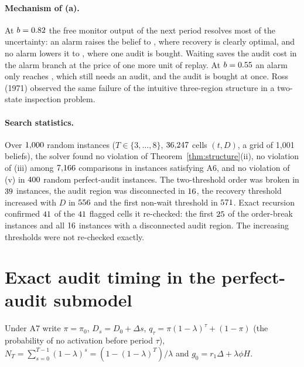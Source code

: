 \documentclass[11pt]{article}
\theoremstyle{definition}
\begin{document}
\paragraph{Mechanism of (a).} At $b=0.82$ the free monitor output of the next period resolves most of
the uncertainty: an alarm raises the belief to \PropPostHi, where recovery is clearly optimal, and no
alarm lowers it to \PropPostLo, where one audit is bought. Waiting saves the audit cost in the alarm branch
at the price of one more unit of replay. At $b=0.55$ an alarm only reaches \PropPostMid, which still
needs an audit, and the audit is bought at once. Ross (1971) observed the same failure of the intuitive
three-region structure in a two-state inspection problem.

\begin{table}[h]
\centering
\caption{Exhaustive enumeration for Proposition~\ref{prop:counter}: minimum expected cost over all
deterministic plans by first action.}\label{tab:prop2}

\end{table}

\paragraph{Search statistics.} Over $1{,}000$ random instances ($T\in\{3,\dots,8\}$, $36{,}247$
cells $(t,D)$, a grid of 1{,}001 beliefs), the solver found no violation of Theorem~\ref{thm:structure}(ii),
no violation of (iii) among $7{,}166$ comparisons in instances satisfying A6, and no violation of (v)
in $400$ random perfect-audit instances. The two-threshold order was broken in
$39$ instances, the audit region was disconnected in $16$, the recovery threshold
increased with $D$ in $556$ and the first non-wait threshold in $571$. Exact recursion
confirmed $41$ of the $41$ flagged cells it re-checked: the first
$25$ of the order-break instances and all $16$ instances with a
disconnected audit region. The increasing thresholds were not re-checked exactly.

\section{Exact audit timing in the perfect-audit submodel}

Under A7 write $\pi=\pi_0$, $D_s=D_0+\Delta s$, $q_\tau=\pi(1-\lambda)^\tau+(1-\pi)$ (the probability of no
activation before period $\tau$), $N_T=\sum_{s=0}^{T-1}(1-\lambda)^s=(1-(1-\lambda)^T)/\lambda$ and
$g_0=r_1\Delta+\lambda\phi H$.
\end{document}

